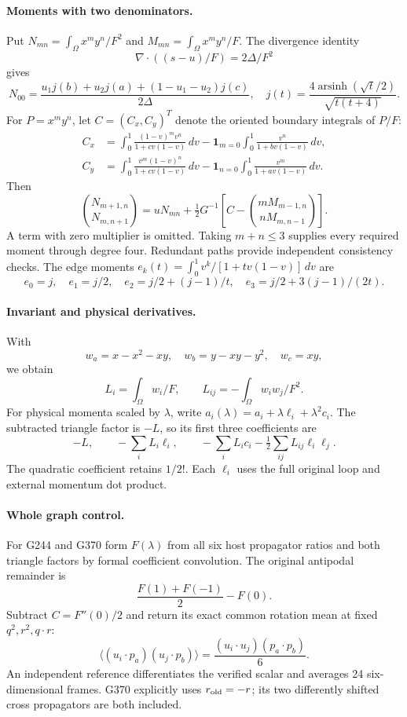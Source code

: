 \documentclass[11pt]{article}
\begin{document}
\paragraph{Moments with two denominators.}
Put $N_{mn}=\int_\Omega x^my^n/F^2$ and $M_{mn}=\int_\Omega x^my^n/F$.
The divergence identity
\[
\nabla\cdot((s-u)/F)=2\Delta/F^2
\]
gives
\[
N_{00}=\frac{u_1j(b)+u_2j(a)+(1-u_1-u_2)j(c)}{2\Delta},
\quad
j(t)=\frac{4\operatorname{arsinh}(\sqrt t/2)}{\sqrt{t(t+4)}} .
\]
For $P=x^my^n$, let $C=(C_x,C_y)^T$ denote the oriented boundary integrals of $P/F$:
\begin{align*}
C_x&=\int_0^1\frac{(1-v)^m v^n}{1+cv(1-v)}\,dv
-\mathbf1_{m=0}\int_0^1\frac{v^n}{1+bv(1-v)}\,dv,\\
C_y&=\int_0^1\frac{v^m(1-v)^n}{1+cv(1-v)}\,dv
-\mathbf1_{n=0}\int_0^1\frac{v^m}{1+av(1-v)}\,dv .
\end{align*}
Then
\[
\binom{N_{m+1,n}}{N_{m,n+1}}
=uN_{mn}+\tfrac12G^{-1}
\left[C-\binom{mM_{m-1,n}}{nM_{m,n-1}}\right].
\]
A term with zero multiplier is omitted. Taking $m+n\leq3$ supplies every required moment through degree four. Redundant paths provide independent consistency checks.
The edge moments $e_k(t)=\int_0^1v^k/[1+tv(1-v)]\,dv$ are
\[
e_0=j,\quad e_1=j/2,\quad e_2=j/2+(j-1)/t,\quad
e_3=j/2+3(j-1)/(2t).
\]

\paragraph{Invariant and physical derivatives.}
With
\[
w_a=x-x^2-xy,\quad w_b=y-xy-y^2,\quad w_c=xy,
\]
we obtain
\[
L_i=\int_\Omega w_i/F,\qquad L_{ij}=-\int_\Omega w_iw_j/F^2 .
\]
For physical momenta scaled by $\lambda$, write
$a_i(\lambda)=a_i+\lambda\ell_i+\lambda^2c_i$.
The subtracted triangle factor is $-L$, so its first three coefficients are
\[
-L,\qquad-\sum_iL_i\ell_i,\qquad
-\sum_iL_ic_i-\tfrac12\sum_{ij}L_{ij}\ell_i\ell_j .
\]
The quadratic coefficient retains $1/2!$. Each $\ell_i$ uses the full original loop and external momentum dot product.

\paragraph{Whole graph control.}
For G244 and G370 form $F(\lambda)$ from all six host propagator ratios and both triangle factors by formal coefficient convolution.
The original antipodal remainder is
\[
\frac{F(1)+F(-1)}2-F(0).
\]
Subtract $C=F''(0)/2$ and return its exact common rotation mean at fixed $q^2,r^2,q\cdot r$:
\[
\big\langle (u_i\cdot p_a)(u_j\cdot p_b)\big\rangle
=\frac{(u_i\cdot u_j)(p_a\cdot p_b)}6 .
\]
An independent reference differentiates the verified scalar and averages 24 six-dimensional frames. G370 explicitly uses $r_{\rm old}=-r$; its two differently shifted cross propagators are both included.
\end{document}
